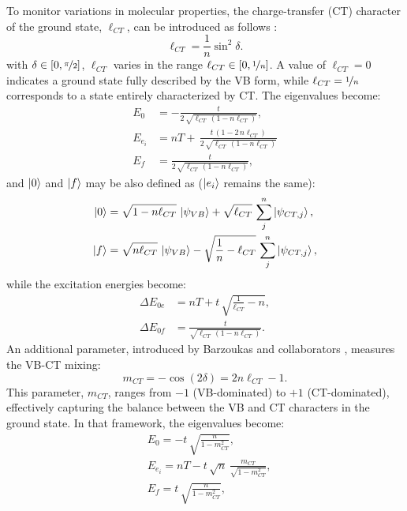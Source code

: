 \documentclass[USenglish]{article}
\begin{document}
To monitor variations in molecular properties, the charge-transfer (CT) character of the ground state, $\ell_{CT}$, can be introduced as follows \cite{choNonlinearOpticalProperties2002,choElementaryDescriptionNonlinear1998,yangLargeOffDiagonalContribution2003}:
\begin{equation}
	\ell_{CT} = \frac{1}{n} \sin^2 \delta.
\end{equation}
with $\delta \in [0, \nicefrac{\pi}{2}]$, $\ell_{CT}$ varies in the range $\ell_{CT} \in [0, \nicefrac{1}{n}]$. A value of $\ell_{CT} = 0$ indicates a ground state fully described by the VB form, while $\ell_{CT} = \nicefrac{1}{n}$ corresponds to a state entirely characterized by CT.  The eigenvalues become:\begin{align}
	E_{0} &= -\frac{t}{2\,\sqrt{\ell_{CT}\,(1-n\ell_{CT})}},\nonumber\\
	E_{e_i} &= nT +\,\frac{t\,(1-2\,n\ell_{CT})}{2\,\sqrt{\ell_{CT}\,(1-n\ell_{CT})}}\nonumber \\
	E_{f} &= \frac{t}{2\,\sqrt{\ell_{CT}\,(1-n\ell_{CT})}},
\end{align}
and $\ket{0}$ and $\ket{f}$ may be also defined as ($\ket{{e_i}}$ remains the same):\begin{align}
	\ket{0} &= \sqrt{1-n\ell_{CT}}\,\ket{\psi_{VB}} + \sqrt{\ell_{CT}}\,\sum_j^n \ket{\psi_{CT,j}},\nonumber\\
	\ket{f} &= \sqrt{n\ell_{CT}}\,\ket{\psi_{VB}} - \sqrt{\frac{1}{n}-\ell_{CT}}\,\sum_j^n \ket{\psi_{CT,j}},
\end{align}
while the excitation energies become:\begin{align}
	\Delta E_{0e}&= nT + t\,\sqrt{\frac{1}{\ell_{CT}}-n},\\
	\Delta E_{0f} &= \frac{t}{\sqrt{\ell_{CT}\,(1-n\ell_{CT})}}.
\end{align}
An additional parameter, introduced by Barzoukas and collaborators \cite{barzoukasTWOFORMDESCRIPTIONPUSHPULL1996,barzoukasTwostateDescriptionHyper1996,blanchard-desceTwoformTwostateAnalysis1998a}, measures the VB-CT mixing:
\begin{equation}
	m_{CT} = -\cos(2\delta) = 2n \ell_{CT} - 1.
\end{equation} 
This parameter, $m_{CT}$, ranges from $-1$ (VB-dominated) to $+1$ (CT-dominated), effectively capturing the balance between the VB and CT characters in the ground state. In that framework, the eigenvalues become:\begin{align}
&E_{0} = -t\,\sqrt{\frac{n}{1-m_{CT}^2}}, \nonumber\\
&E_{e_i} = nT -t\,\sqrt{n}\,\frac{m_{CT}}{\sqrt{1-m_{CT}^2}},\nonumber\\
&E_{f} = t\,\sqrt{\frac{n}{1-m_{CT}^2}},
\end{align} 
\end{document}

